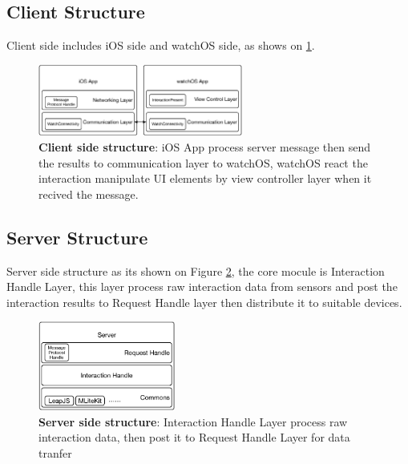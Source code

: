 \subsection{Client Structure}

Client side includes iOS side and watchOS side, as shows on \ref{fig:client-arch}.

\begin{figure}[H]
    \kaishu
    \centering
    \includegraphics[width=0.6\textwidth]{figures/client-arch}
    \caption{\kaishu \textbf{Client side structure}: iOS App process server message then send the results to communication layer to watchOS, watchOS react the interaction manipulate UI elements by view controller layer when it recived the message.}
    \label{fig:client-arch}
\end{figure}

\subsection{Server Structure}

Server side structure as its shown on Figure \ref{fig:server-arch}, the core mocule is Interaction Handle Layer, this layer process raw interaction data from sensors and post the interaction results to Request Handle layer then distribute it to suitable devices.

\begin{figure}[H]
    \kaishu
    \centering
    \includegraphics[width=0.4\textwidth]{figures/server-arch}
    \caption{\kaishu \textbf{Server side structure}: Interaction Handle Layer process raw interaction data, then post it to Request Handle Layer for data tranfer}
    \label{fig:server-arch}
\end{figure}

